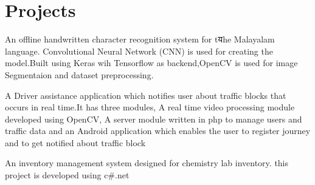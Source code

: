 \documentclass[11pt]{hieudo-build}
\begin{document}
\begin{minipage}[t]{0.63\textwidth}
         \section{Projects}
         \descript{}
         \par \noindent
         An offline handwritten character recognition system for tयhe Malayalam language. Convolutional Neural Network (CNN) is used for creating the model.Built using Keras wih Tensorflow as backend,OpenCV is used for image Segmentaion and dataset preprocessing.    
         \sectionsep

         \descript{}
         \par \noindent
         A Driver assistance  application which notifies user about traffic blocks that occurs  in  real time.It has three modules,  A real time video processing module developed using OpenCV, A server module written in php to manage users and traffic data and an Android application which enables the user to register journey and to get notified about traffic block 

         \sectionsep 

         \descript{}
         An inventory management system designed for chemistry lab inventory. this project is developed using c\#.net 
         \sectionsep

         \end{minipage} 

         
\end{document}
